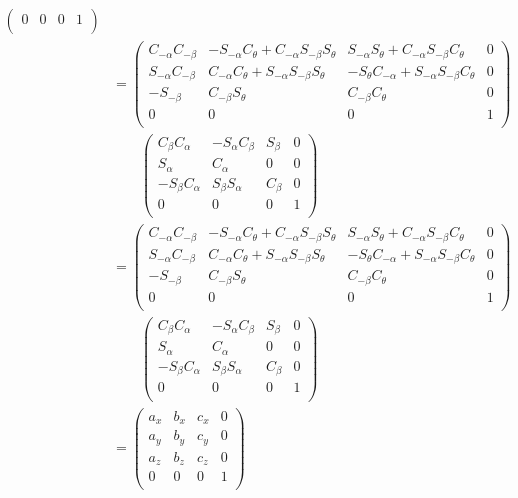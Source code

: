 \documentclass[a4paper,11pt]{article}
\begin{document}
\begin {enumerate}
\begin{align*}
\begin{pmatrix}
				0 & 0 & 0 & 1\\
			\end{pmatrix}\\
			&= \begin{pmatrix}
				C_{-\alpha}C_{-\beta} & -S_{-\alpha}C_{\theta}+C_{-\alpha}S_{-\beta}S_{\theta} & S_{-\alpha}S_{\theta}+C_{-\alpha}S_{-\beta}C_{\theta} & 0\\
				S_{-\alpha}C_{-\beta} & C_{-\alpha}C_{\theta}+S_{-\alpha}S_{-\beta}S_{\theta} & -S_{\theta}C_{-\alpha}+S_{-\alpha}S_{-\beta}C_{\theta} & 0\\
				-S_{-\beta} & C_{-\beta}S_{\theta} & C_{-\beta}C_{\theta} & 0\\
				0 & 0 & 0 & 1\\
			\end{pmatrix}\\
			&\qquad \begin{pmatrix}
				C_{\beta}C_{\alpha} & -S_{\alpha}C_{\beta} & S_{\beta} & 0\\
				S_{\alpha} & C_{\alpha} & 0 & 0\\
				-S_{\beta}C_{\alpha} & S_{\beta}S_{\alpha} & C_{\beta} & 0\\
				0 & 0 & 0 & 1\\
			\end{pmatrix}\\
			&= \begin{pmatrix}
				C_{-\alpha}C_{-\beta} & -S_{-\alpha}C_{\theta}+C_{-\alpha}S_{-\beta}S_{\theta} & S_{-\alpha}S_{\theta}+C_{-\alpha}S_{-\beta}C_{\theta} & 0\\
				S_{-\alpha}C_{-\beta} & C_{-\alpha}C_{\theta}+S_{-\alpha}S_{-\beta}S_{\theta} & -S_{\theta}C_{-\alpha}+S_{-\alpha}S_{-\beta}C_{\theta} & 0\\
				-S_{-\beta} & C_{-\beta}S_{\theta} & C_{-\beta}C_{\theta} & 0\\
				0 & 0 & 0 & 1\\
			\end{pmatrix}\\
			&\qquad \begin{pmatrix}
				C_{\beta}C_{\alpha} & -S_{\alpha}C_{\beta} & S_{\beta} & 0\\
				S_{\alpha} & C_{\alpha} & 0 & 0\\
				-S_{\beta}C_{\alpha} & S_{\beta}S_{\alpha} & C_{\beta} & 0\\
				0 & 0 & 0 & 1\\
			\end{pmatrix}\\
			&= \begin{pmatrix}
				a_x & b_x & c_x & 0\\
				a_y & b_y & c_y & 0\\
				a_z & b_z & c_z & 0\\
				0 & 0 & 0 & 1\\
			\end{pmatrix}\\
		\end{align*}
		

\end{enumerate}
\end{document}
